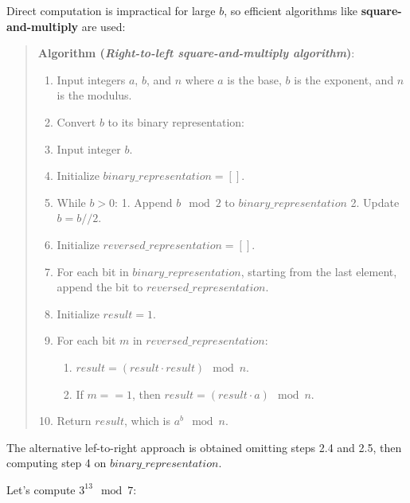 \documentclass[
  letterpaper,
  DIV=11,
  numbers=noendperiod,
  oneside]{scrartcl}
\providecommand{\tightlist}{%
  \setlength{\itemsep}{0pt}\setlength{\parskip}{0pt}}\usepackage{longtable,booktabs,array}
\begin{document}
Direct computation is impractical for large \(b\), so efficient
algorithms like \textbf{square-and-multiply} are used:

\begin{quote}
\textbf{Algorithm (\emph{Right-to-left square-and-multiply algorithm})}:

\begin{enumerate}
\def\labelenumi{\arabic{enumi}.}
\item
  Input integers \(a\), \(b\), and \(n\) where \(a\) is the base, \(b\)
  is the exponent, and \(n\) is the modulus.
\item
  Convert \(b\) to its binary representation:
\item
  Input integer \(b\).
\item
  Initialize \(binary\_representation = []\).
\item
  While \(b > 0\): 1. Append \(b \mod 2\) to \(binary\_representation\)
  2. Update \(b = b // 2\).
\item
  Initialize \(reversed\_representation = []\).
\item
  For each bit in \(binary\_representation\), starting from the last
  element, append the bit to \(reversed\_representation\).
\item
  Initialize \(result = 1\).
\item
  For each bit \(m\) in \(reversed\_representation\):

  \begin{enumerate}
  \def\labelenumii{\arabic{enumii}.}
  \tightlist
  \item
    \(result = (result \cdot result) \mod n\).
  \item
    If \(m == 1\), then \(result = (result \cdot a) \mod n\).
  \end{enumerate}
\item
  Return \(result\), which is \(a^b \mod n\).
\end{enumerate}
\end{quote}

The alternative lef-to-right approach is obtained omitting steps 2.4 and
2.5, then computing step 4 on \(binary\_representation\).

Let's compute \(3^{13} \mod 7\):
\end{document}
